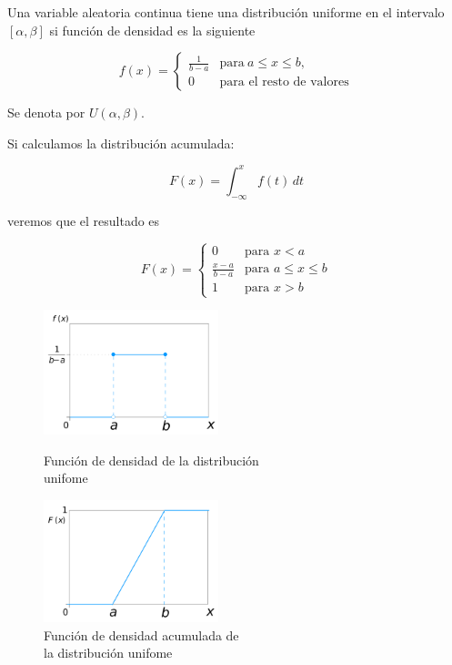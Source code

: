 \documentclass[]{book}
\theoremstyle{plain}
\theoremstyle{definition}
\theoremstyle{definition} %
\begin{document}
Una variable aleatoria continua tiene una distribución uniforme en el
intervalo \([\alpha, \beta]\) si función de densidad es la siguiente

\[f(x)=\begin{cases}{\frac {1}{b-a}}&\mathrm {para} \ a\leq x\leq b,\\[8pt]0&\text {para el resto de valores}\end{cases}\]

Se denota por \(U(\alpha, \beta)\).

Si calculamos la distribución acumulada:

\[F(x)= \int _{-\infty }^{x}f(t)\,dt\]

veremos que el resultado es

\[\displaystyle F(x)=\begin{cases}0&{\text{para }}x<a\\[8pt]{\frac {x-a}{b-a}}&{\text{para }}a\leq x\leq b\\[8pt]1&{\text{para }}x>b\end{cases}\]
 

\begin{figure}[htbp]
  \begin{minipage}{0.5\linewidth}
  \centering
  \includegraphics[width=2in,height=\textheight]{img/uniform.png}
  \caption{Función de densidad de la distribución\\ unifome}
  \end{minipage}%
  \begin{minipage}{0.5\linewidth}
  \centering
  \includegraphics[width=2in,height=\textheight]{img/uniform2.png}
  \caption{Función de densidad acumulada de \\la distribución unifome}
  \end{minipage}

\end{figure} 
\end{document}
